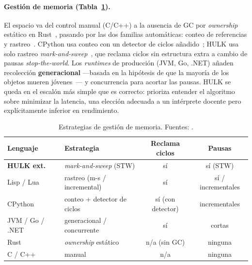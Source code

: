\documentclass[14pts,runningheads,a4paper]{llncs}
\begin{document}
\paragraph{ Gesti\'on de memoria (Tabla~\ref{tab:cmp-gc}).}
El espacio va del control manual (C/C++) a la ausencia de GC por \emph{ownership}
est\'atico en Rust~\cite{klabnik2023rust}, pasando por las dos familias autom\'aticas:
conteo de referencias y rastreo~\cite{jones2011garbage}. CPython usa conteo con un
detector de ciclos a\~nadido~\cite{bacon2001recycler}; HULK usa solo rastreo
\emph{mark-and-sweep}~\cite{mccarthy1960recursive}, que reclama ciclos sin estructura
extra a cambio de pausas \emph{stop-the-world}. Los \emph{runtimes} de producci\'on
(JVM, Go, .NET) a\~naden recolecci\'on \textbf{generacional} ---basada en la hip\'otesis
de que la mayor\'ia de los objetos mueren j\'ovenes~\cite{ungar1984generation}--- y
concurrencia para acortar las pausas. HULK se queda en el escal\'on m\'as simple que es
correcto: prioriza entender el algoritmo sobre minimizar la latencia, una elecci\'on
adecuada a un int\'erprete docente pero expl\'icitamente inferior en rendimiento.

\begin{table}[h!]
\centering\small
\caption{Estrategias de gesti\'on de memoria. Fuentes:
\cite{jones2011garbage,mccarthy1960recursive,bacon2001recycler,ungar1984generation,klabnik2023rust,ierusalimschy2016lua}.}
\label{tab:cmp-gc}
\begin{tabular}{@{}llcc@{}}
\toprule
\textbf{Lenguaje} & \textbf{Estrategia} & \textbf{Reclama ciclos} & \textbf{Pausas} \\
\midrule
\textbf{HULK ext.} & \emph{mark-and-sweep} (STW) & s\'i & s\'i (STW) \\
Lisp / Lua & rastreo (m-s / incremental) & s\'i & s\'i / incrementales \\
CPython & conteo + detector de ciclos & s\'i (con detector) & incrementales \\
JVM / Go / .NET & generacional / concurrente & s\'i & cortas \\
Rust & \emph{ownership} est\'atico & n/a (sin GC) & ninguna \\
C / C++ & manual & n/a & ninguna \\
\bottomrule
\end{tabular}
\end{table}
\end{document}
